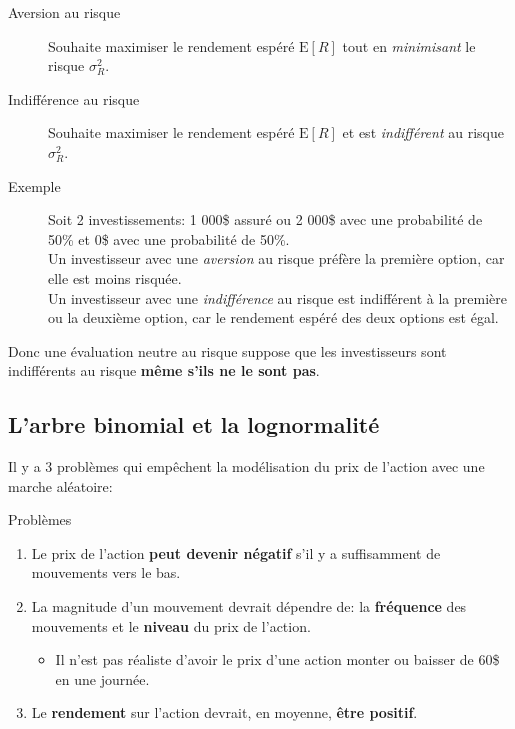 \documentclass[10pt, french]{article}
\begin{document}
\begin{multicols*}{2}
\begin{description}
	\item[Aversion au risque]	Souhaite maximiser le rendement espéré $\text{E}[R]$ tout en \textit{minimisant} le risque $\sigma^{2}_{R}$.
	\item[Indifférence au risque]	Souhaite maximiser le rendement espéré $\text{E}[R]$ et est \textit{indifférent} au risque $\sigma^{2}_{R}$.
	\item[Exemple]	Soit 2 investissements: 1 000\$ assuré ou 2 000\$ avec une probabilité de 50\% et 0\$ avec une probabilité de 50\%.\\
					Un investisseur avec une \textit{aversion} au risque préfère la première option, car elle est moins risquée.	\\
					Un investisseur avec une \textit{indifférence} au risque est indifférent à la première ou la deuxième option, car le rendement espéré des deux options est égal.
\end{description}

Donc une évaluation neutre au risque suppose que les investisseurs sont indifférents au risque \textbf{même s'ils ne le sont pas}.


\subsection*{L'arbre binomial et la lognormalité}

Il y a 3 problèmes qui empêchent la modélisation du prix de l'action avec une marche aléatoire:
\begin{conceptgen}{Problèmes}
\begin{enumerate}[leftmargin = *]
	\item	Le prix de l'action \textbf{peut devenir négatif} s'il y a suffisamment de mouvements vers le bas. 
	\item	La magnitude d'un mouvement devrait dépendre de: la \textbf{fréquence} des mouvements et le \textbf{niveau} du prix de l'action.
		\begin{itemize}[leftmargin = *]
		\item	Il n'est pas réaliste d'avoir le prix d'une action monter ou baisser de 60\$ en une journée.
		\end{itemize}
	\item	Le \textbf{rendement} sur l'action devrait, en moyenne, \textbf{être positif}.
\end{enumerate}
\end{conceptgen}


\end{multicols*}
\end{document}
